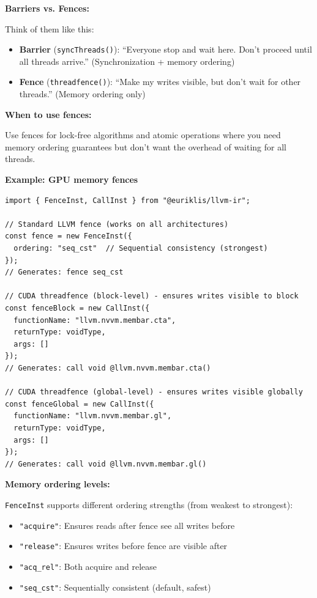 \documentclass[11pt,oneside]{book}
\begin{document}
\textbf{Barriers vs. Fences:}

Think of them like this:
\begin{itemize}[noitemsep]
  \item \textbf{Barrier} (\texttt{syncThreads()}): ``Everyone stop and wait here. Don't proceed until all threads arrive.'' (Synchronization + memory ordering)
  \item \textbf{Fence} (\texttt{threadfence()}): ``Make my writes visible, but don't wait for other threads.'' (Memory ordering only)
\end{itemize}

\textbf{When to use fences:}

Use fences for lock-free algorithms and atomic operations where you need memory ordering guarantees but don't want the overhead of waiting for all threads.

\textbf{Example: GPU memory fences}

\begin{lstlisting}[style=ts]
import { FenceInst, CallInst } from "@euriklis/llvm-ir";

// Standard LLVM fence (works on all architectures)
const fence = new FenceInst({
  ordering: "seq_cst"  // Sequential consistency (strongest)
});
// Generates: fence seq_cst

// CUDA threadfence (block-level) - ensures writes visible to block
const fenceBlock = new CallInst({
  functionName: "llvm.nvvm.membar.cta",
  returnType: voidType,
  args: []
});
// Generates: call void @llvm.nvvm.membar.cta()

// CUDA threadfence (global-level) - ensures writes visible globally
const fenceGlobal = new CallInst({
  functionName: "llvm.nvvm.membar.gl",
  returnType: voidType,
  args: []
});
// Generates: call void @llvm.nvvm.membar.gl()
\end{lstlisting}

\textbf{Memory ordering levels:}

\texttt{FenceInst} supports different ordering strengths (from weakest to strongest):
\begin{itemize}[noitemsep]
  \item \texttt{"acquire"}: Ensures reads after fence see all writes before
  \item \texttt{"release"}: Ensures writes before fence are visible after
  \item \texttt{"acq\_rel"}: Both acquire and release
  \item \texttt{"seq\_cst"}: Sequentially consistent (default, safest)
\end{itemize}
\end{document}
